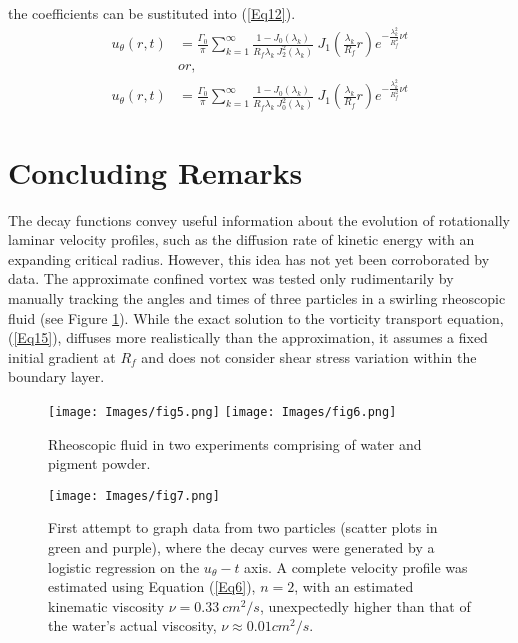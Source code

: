 \documentclass{article}
\begin{document}
the coefficients can be sustituted into (\ref{Eq12}).
\begin{align}\label{Eq15}
    u_\theta (r,t)&=\frac{\Gamma_0}{\pi}\sum_{k=1}^{\infty} \frac{1-J_0 \left(\lambda_k\right)}{R_f \lambda_k\: J_{2}^2\left(\lambda_k\right)} \: J_1\left(\frac{\lambda_k}{R_f}r \right) e^{-\frac{\lambda_k^2}{R_f^2}\nu t}\\
    &\textit{or,}\\
    u_\theta (r,t)&=\frac{\Gamma_0}{\pi}\sum_{k=1}^{\infty} \frac{1-J_0 \left(\lambda_k\right)}{R_f \lambda_k\: J_{0}^2\left(\lambda_k\right)} \: J_1\left(\frac{\lambda_k}{R_f}r \right) e^{-\frac{\lambda_k^2}{R_f^2}\nu t}
\end{align}

\section{Concluding Remarks}
The decay functions convey useful information about the evolution of rotationally laminar velocity profiles, such as the diffusion rate of kinetic energy with an expanding critical radius. However, this idea has not yet been corroborated by data. The approximate confined vortex was tested only rudimentarily by manually tracking the angles and times of three particles in a swirling rheoscopic fluid (see Figure \ref{5}). While the exact solution to the vorticity transport equation, (\ref{Eq15}), diffuses more realistically than the approximation, it assumes a fixed initial gradient at $R_f$ and does not consider shear stress variation within the boundary layer.
\begin{figure}[h]
    \texttt{[image: Images/fig5.png]}
    \texttt{[image: Images/fig6.png]}
    \caption{Rheoscopic fluid in two experiments comprising of water and pigment powder.}
    \label{5}
\end{figure}
\begin{figure}[h]
\centering
    \texttt{[image: Images/fig7.png]}
    \caption{First attempt to graph data from two particles (scatter plots in green and purple), where the decay curves were generated by a logistic regression on the $u_\theta -t$ axis. A complete velocity profile was estimated using Equation (\ref{Eq6}), $n=2$, with an estimated kinematic viscosity $\nu=0.33 \:cm^2 /s$, unexpectedly higher than that of the water's actual viscosity, $\nu \approx 0.01 cm^2/s$.}
\end{figure}
\end{document}
